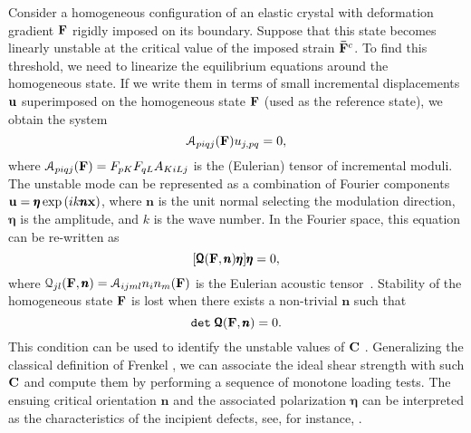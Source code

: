 \documentclass[CRPHYS,Unicode,manuscript]{cedram}
\def\Det{{\tt det}\hspace{1mm}}
\begin{document}
Consider a homogeneous configuration  of an elastic crystal with deformation gradient ${\bf F}$ rigidly imposed on its boundary. Suppose that this state becomes linearly unstable at the critical value of the imposed strain ${\bf \bar F}^c$.  To find this threshold,   we need to linearize   the  equilibrium equations around the homogeneous  state.   If we  write them  in terms of   small incremental displacements  ${\bf u}$ superimposed on the homogeneous state ${\bf F}$ (used as the  reference state),  we obtain the system
$$
{ \mathcal  A}_{piqj}({\bf F})  u_{j,pq}=0,
$$
where 
$
{\mathcal A}_{piqj} ({\bf F})= F_{pK}F_{qL}A_{KiLj} 
$
is the (Eulerian) tensor of  incremental moduli. 
%
The unstable mode can be represented as a combination of Fourier components  ${\bf u} =\pmb{\eta}\exp{(i k  {{\pmb n}{\bf x}})}$, where $\pmb{n}$ is the unit normal selecting the modulation direction,  $\pmb{\eta}$ is the amplitude, and $k$ is the wave number.   In the Fourier space,   this equation can be re-written as $$[{\pmb{\mathcal Q}}({\bf F},\pmb{n})\pmb{\eta}]\pmb{\eta} =0,
$$
where ${\mathcal Q_{jl}({\bf F}, \pmb{n}})={\mathcal A}_{ijml}n_in_m ({\bf F})$ is the Eulerian acoustic tensor~\cite{Merodio,Kumar2015-xo}. 
 Stability of the homogeneous state  ${\bf F}$ is lost when there exists a 
non-trivial $\pmb{n}$ such that   $$\Det {{ \pmb{\mathcal Q}}}({\bf F}, \pmb{n})=0.$$ This condition can be used to identify   the  unstable values of  $\bf C$  \cite{Hill1962-fb,Rice1976-ta, ogden1997non}.   Generalizing  the classical definition of Frenkel \cite{Anderson2017-qz}, we can   associate the    ideal  shear strength   with such $\bf C$  and compute them by performing  a sequence of monotone loading tests. The ensuing critical orientation $\pmb{n}$ and the associated polarization $\pmb{\eta}$   can be interpreted as the characteristics of the incipient  defects, see,  for instance,   \cite{ Van_Vliet2003-yg, Zhu2004-wr,Zhong2008-pj,Miller2008-rr,Bigoni2012-by, Garg2016-kz}.
  
\end{document}
